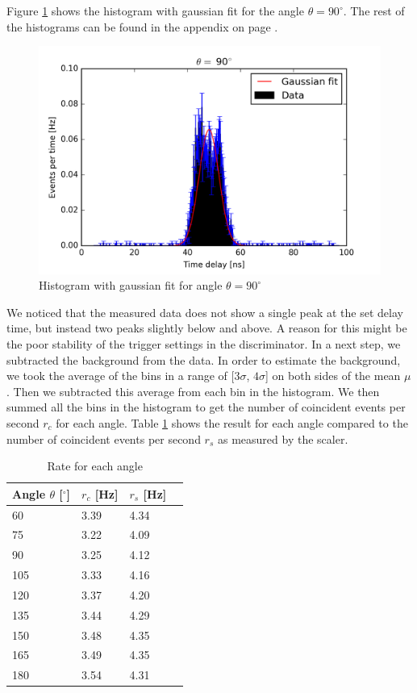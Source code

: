 \documentclass[a4paper,parskip,11pt, DIV12]{scrreprt}
\begin{document}
Figure \ref{fig:hist120} shows the histogram with gaussian fit for the angle $\theta = 90^{\circ}$. The rest of the histograms can be found in the appendix on page \pageref{app:histogram}.
%
\begin{figure}[H]
\centering
\includegraphics[scale=0.65]{90deg.png}
\caption[Histogram]{Histogram with gaussian fit for angle $\theta = 90^{\circ}$}
\label{fig:hist120}
\end{figure}
%
We noticed that the measured data does not show a single peak at the set delay time, but instead two peaks slightly below and above. A reason for this might be the poor stability of the trigger settings in the discriminator. In a next step, we subtracted the background from the data. In order to estimate the background, we took the average of the bins in a range of [$3\sigma$, $4\sigma$] on both sides of the mean $\mu$. Then we subtracted this average from each bin in the histogram. We then summed all the bins in the histogram to get the number of coincident events per second $r_c$ for each angle. Table \ref{tab:nevents} shows the result for each angle compared to the number of coincident events per second $r_{s}$ as measured by the scaler.
%
\begin{table}[H]
\begin{center}
\begin{tabular}{llll}
Angle $\theta$ [$^{\circ}$] & $r_{c}$ [Hz] & $r_{s}$ [Hz]\\
\hline
60 	& 3.39 & 4.34\\
  75 	& 3.22 & 4.09\\
  90 	& 3.25 & 4.12\\
105 	& 3.33 & 4.16\\
120	& 3.37 & 4.20\\
135	& 3.44 & 4.29\\
150	& 3.48 & 4.35\\
165	& 3.49 & 4.35\\
180	& 3.54 & 4.31\\ 
\end{tabular}
\caption{Rate for each angle}
\label{tab:nevents}
\end{center}
\end{table}
%
\end{document}
